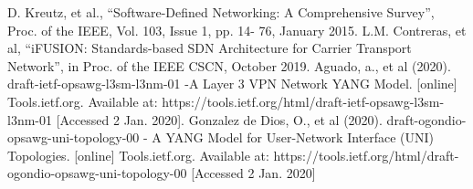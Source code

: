 \documentclass[conference]{IEEEtran}
\begin{document}
\begin{thebibliography}{00}
 D. Kreutz, et al., “Software-Defined Networking: A Comprehensive Survey”, Proc. of the IEEE, Vol. 103, Issue 1, pp. 14- 76, January 2015.
 L.M. Contreras, et al, “iFUSION: Standards-based SDN Architecture for Carrier Transport Network”, in Proc. of the IEEE CSCN, October 2019.
 Aguado, a., et al (2020). draft-ietf-opsawg-l3sm-l3nm-01 -A Layer 3 VPN Network YANG Model. [online] Tools.ietf.org. Available at: https://tools.ietf.org/html/draft-ietf-opsawg-l3sm-l3nm-01 [Accessed 2 Jan. 2020].
 Gonzalez de Dios, O., et al (2020). draft-ogondio-opsawg-uni-topology-00 - A YANG Model for User-Network Interface (UNI) Topologies. [online] Tools.ietf.org. Available at: https://tools.ietf.org/html/draft-ogondio-opsawg-uni-topology-00 [Accessed 2 Jan. 2020]
\end{thebibliography}
\end{document}
